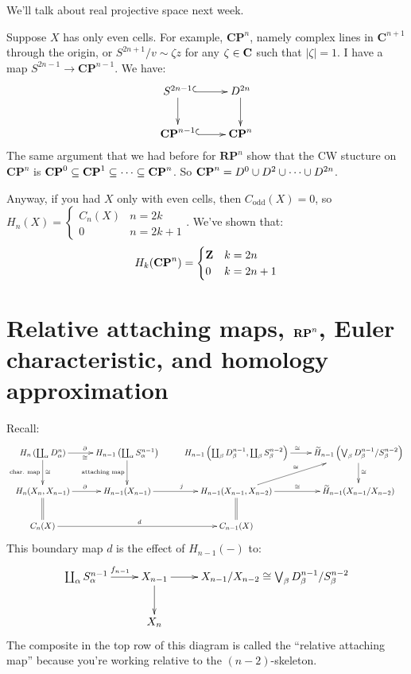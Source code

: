 We'll talk about real projective space next week.
\begin{remark}
Suppose $X$ has only even cells. For example, $\mathbf{CP}^n$, namely complex lines in $\mathbf{C}^{n+1}$ through the origin, or $S^{2n+1}/v\sim \zeta z$ for any $\zeta\in \mathbf C$ such that $|\zeta|=1$. I have a map $S^{2n-1}\to \mathbf{CP}^{n-1}$. We have:
\begin{equation*}
\xymatrix{S^{2n-1}\ar@{^(->}[r]\ar[d] & D^{2n}\ar[d]\\
\mathbf{CP}^{n-1}\ar@{^(->}[r] & \mathbf{CP}^n}
\end{equation*}
The same argument that we had before for $\mathbf{RP}^n$ show that the CW stucture on $\mathbf{CP}^n$ is $\mathbf{CP}^0\subseteq\mathbf{CP}^1\subseteq\cdots\subseteq\mathbf{CP}^n$. So $\mathbf{CP}^n=D^0\cup D^2\cup\cdots\cup D^{2n}$.

Anyway, if you had $X$ only with even cells, then $C_{\text{odd}}(X)=0$, so $ H_n(X)=\begin{cases}C_n(X) & n=2k \\ 0 & n=2k+1\end{cases}$. We've shown that:
\begin{equation*}
 H_k(\mathbf{CP}^n)=\begin{cases}
\mathbf Z & k=2n\\
0 & k=2n+1
\end{cases}
\end{equation*}
\end{remark}
\section{Relative attaching maps, $\mathbf{RP}^n$, Euler characteristic, and homology approximation}
Recall:
\begin{equation*}
\xymatrix{ H_n\left(\coprod_\alpha D^n_\alpha\right)\ar[r]^\partial_\cong\ar[d]^\cong_{\text{char. map}} & H_{n-1}\left(\coprod_\alpha S^{n-1}_\alpha\right)\ar[d]_{\text{attaching map}} & H_{n-1}\left(\coprod_\beta D^{n-1}_\beta,\coprod_\beta S^{n-2}_\beta\right) \ar[r]^\cong & \widetilde{ H}_{n-1}\left(\bigvee_\beta D^{n-1}_\beta/S^{n-2}_\beta\right)\ar[d]^\cong\\
 H_n(X_n,X_{n-1})\ar[r]^\partial\ar@{=}[d] & H_{n-1}(X_{n-1})\ar[r]^j & H_{n-1}(X_{n-1},X_{n-2})\ar[r]^\cong\ar[ur]^\cong\ar@{=}[d] & \widetilde{ H}_{n-1}(X_{n-1}/X_{n-2})\\
C_n(X)\ar[rr]^d & & C_{n-1}(X)}
\end{equation*}
This boundary map $d$ is the effect of $ H_{n-1}(-)$ to:
\begin{equation*}
\xymatrix{\coprod_\alpha S^{n-1}_\alpha\ar[r]^{f_{n-1}} & X_{n-1}\ar[d]\ar[r] & X_{n-1}/X_{n-2}\cong \bigvee_\beta D^{n-1}_\beta/S^{n-2}_\beta\\
 & X_n}
\end{equation*}
The composite in the top row of this diagram is called the ``relative attaching map'' because you're working relative to the $(n-2)$-skeleton.

